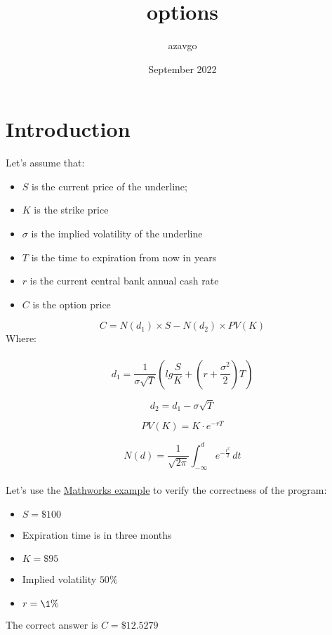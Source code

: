 \documentclass{article}
\title{options}
\author{azavgo}
\date{September 2022}
\begin{document}
\maketitle

\section{Introduction}

Let's assume that: 
\begin{itemize}
    \item $S$ is the current price of the underline;
    \item $K$ is the strike price
    \item $\sigma$ is the implied volatility of the underline
    \item $T$ is the time to expiration from now in years
    \item $r$ is the current central bank annual cash rate
    \item $C$ is the option price
\end{itemize}

\begin{equation}
    C = N\left(d_1\right) \times S - N\left(d_2\right) \times PV\left(K\right) 
\end{equation}
Where: \\\\
\begin{equation}
    d_1 = \frac{1}{\sigma \sqrt{T}} \left(lg\frac{S}{K} + \left(r + \frac{\sigma^2}{2}\right)T\right)
\end{equation}

\begin{equation}
    d_2 = d_1 - \sigma \sqrt{T}
\end{equation}

\begin{equation}
    PV\left(K\right) = K \cdot e^{-rT}  
\end{equation}

\begin{equation}
    N\left(d\right) = \frac{1}{\sqrt{2\pi}} \int_{-\infty}^{d} e^{-\frac{t^2}{2}} \,dt 
\end{equation}
\\
Let's use the \href{https://www.mathworks.com/help/symbolic/the-black-scholes-formula-for-call-option-price.html}{Mathworks example} to verify the correctness of the program:
\begin{itemize}
    \item $S = \$100$
    \item Expiration time is in three months
    \item $K = \$95$
    \item Implied volatility $50\%$
    \item $r = \1\%$  
\end{itemize}
The correct answer is $C = \$12.5279$
\end{document}
